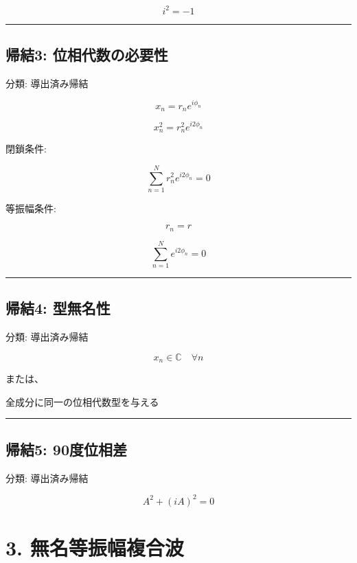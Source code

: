 \documentclass[
  a4paper,
]{ltjsarticle}
\newenvironment{Shaded}{}{}
\newcommand{\NormalTok}[1]{#1}
\begin{document}
\[
i^2=-1
\]

\begin{center}\rule{0.5\linewidth}{0.5pt}\end{center}

\subsection{帰結3:
位相代数の必要性}\label{ux5e30ux7d503-ux4f4dux76f8ux4ee3ux6570ux306eux5fc5ux8981ux6027}

分類: 導出済み帰結

\[
x_n=r_n e^{i\phi_n}
\]

\[
x_n^2=r_n^2e^{i2\phi_n}
\]

閉鎖条件:

\[
\sum_{n=1}^{N}r_n^2e^{i2\phi_n}=0
\]

等振幅条件:

\[
r_n=r
\]

\[
\sum_{n=1}^{N}e^{i2\phi_n}=0
\]

\begin{center}\rule{0.5\linewidth}{0.5pt}\end{center}

\subsection{帰結4:
型無名性}\label{ux5e30ux7d504-ux578bux7121ux540dux6027}

分類: 導出済み帰結

\[
x_n\in\mathbb{C}\quad\forall n
\]

または、

\begin{Shaded}
\begin{Highlighting}[]
\NormalTok{全成分に同一の位相代数型を与える}
\end{Highlighting}
\end{Shaded}

\begin{center}\rule{0.5\linewidth}{0.5pt}\end{center}

\subsection{帰結5:
90度位相差}\label{ux5e30ux7d505-90ux5ea6ux4f4dux76f8ux5dee}

分類: 導出済み帰結

\[
A^2+(iA)^2=0
\]

\section{3.
無名等振幅複合波}\label{ux7121ux540dux7b49ux632fux5e45ux8907ux5408ux6ce2}
\end{document}
